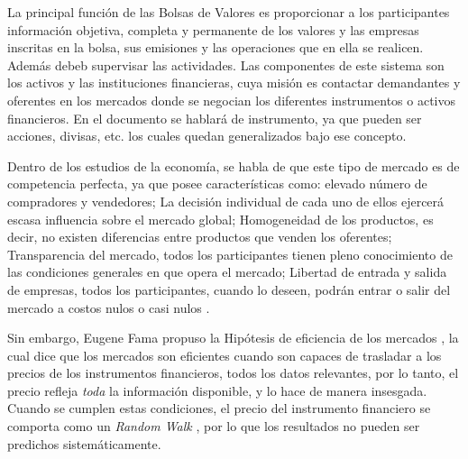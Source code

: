 La principal función de las Bolsas de Valores es proporcionar a los participantes información objetiva, completa y permanente de los valores
y las empresas inscritas en la bolsa, sus emisiones y las operaciones que en ella se realicen. Además debeb supervisar las actividades. Las componentes de este 
sistema son los activos y las instituciones financieras, cuya misión es contactar demandantes y oferentes en los mercados donde se negocian los diferentes instrumentos 
o activos financieros. En el documento se hablará de instrumento, ya que pueden ser acciones, divisas, etc. los cuales quedan generalizados bajo ese concepto.

Dentro de los estudios de la economía, se habla de que este tipo de mercado es de competencia perfecta, ya que posee características
como: elevado número de compradores y vendedores; La decisión individual de cada uno de ellos ejercerá escasa influencia sobre el mercado global; 
Homogeneidad de los productos, es decir, no existen diferencias entre productos que venden los oferentes; Transparencia del mercado, todos los 
participantes tienen pleno conocimiento de las condiciones generales en que opera el mercado; Libertad de entrada y salida de empresas, todos 
los participantes, cuando lo deseen, podrán entrar o salir del mercado a costos nulos o casi nulos \cite{mankiw2011principles}. 

Sin embargo, Eugene Fama propuso la Hipótesis de eficiencia de los mercados \cite{malkiel2012efficient}, la cual dice que los mercados son eficientes cuando
son capaces de trasladar a los precios de los instrumentos financieros, todos los datos relevantes, por lo tanto, el precio refleja \emph{toda} la 
información disponible, y lo hace de manera insesgada. Cuando se cumplen estas condiciones, el precio del instrumento financiero se comporta como un 
\emph{Random Walk} \cite{fama1965random}, por lo que los resultados no pueden ser predichos sistemáticamente.


